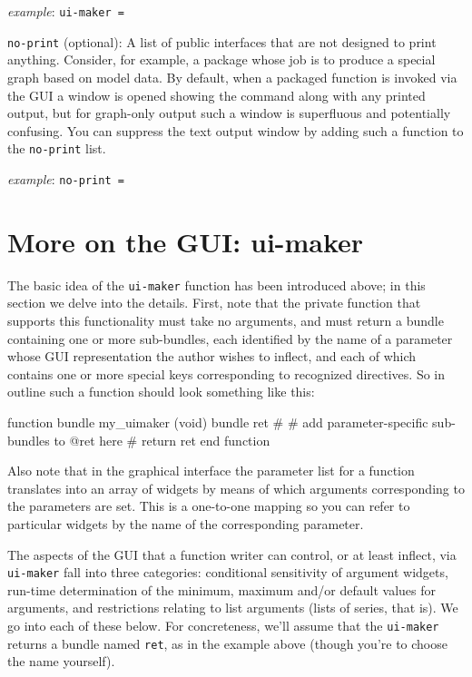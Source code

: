 \documentclass[oneside]{book}
\newcommand{\ttusage}[1]{\textit{example}: \quad \texttt{#1}}
\begin{document}
\begin{description}
  \ttusage{ui-maker = }

\item \texttt{no-print} (optional): A list of public interfaces that
  are not designed to print anything.  Consider, for example, a
  package whose job is to produce a special graph based on model data.
  By default, when a packaged function is invoked via the GUI a window
  is opened showing the command along with any printed output, but for
  graph-only output such a window is superfluous and potentially
  confusing. You can suppress the text output window by adding such a
  function to the \texttt{no-print} list.

  \ttusage{no-print = }

\end{description}

\section{More on the GUI: ui-maker}
\label{sec:ui-maker}

The basic idea of the \texttt{ui-maker} function has been introduced
above; in this section we delve into the details.  First, note that
the private function that supports this functionality must take no
arguments, and must return a bundle containing one or more
sub-bundles, each identified by the name of a parameter whose GUI
representation the author wishes to inflect, and each of which
contains one or more special keys corresponding to recognized
directives. So in outline such a function should look something like
this:

\begin{code}
function bundle my_uimaker (void)
    bundle ret
    #
    # add parameter-specific sub-bundles to @ret here
    #
    return ret
end function
\end{code}

Also note that in the graphical interface the parameter list for a
function translates into an array of widgets by means of which
arguments corresponding to the parameters are set. This is a
one-to-one mapping so you can refer to particular widgets by the name
of the corresponding parameter.

The aspects of the GUI that a function writer can control, or at least
inflect, via \texttt{ui-maker} fall into three categories: conditional
sensitivity of argument widgets, run-time determination of the
minimum, maximum and/or default values for arguments, and restrictions
relating to list arguments (lists of series, that is). We go into each
of these below. For concreteness, we'll assume that the
\texttt{ui-maker} returns a bundle named \texttt{ret}, as in the
example above (though you're to choose the name yourself).
\end{document}
